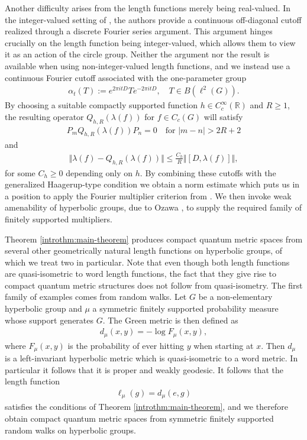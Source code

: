 \documentclass[12pt,a4paper,oneside,final,reqno]{amsart}
\newcommand{\R}{\mathbb{R}}
\theoremstyle{plain}
\theoremstyle{definition}
\begin{document}
Another difficulty arises from the length functions merely being real-valued. In the integer-valued setting of \cite{OzawaRieffel2005}, the authors provide a continuous off-diagonal cutoff realized through a discrete Fourier series argument. This argument hinges crucially on the length function being integer-valued, which allows them to view it as an action of the circle group. Neither the argument nor the result is available when using non-integer-valued length functions, and we instead use a continuous Fourier cutoff associated with the one-parameter group
\begin{align*}
    \alpha_t (T) := e^{2\pi i t D} T e^{-2\pi i t D},\quad T \in B(\ell^2(G)). 
\end{align*}
By choosing a suitable compactly supported function $h \in C_c^\infty(\R)$ and $R \geq 1$, the resulting operator $Q_{h,R}(\lambda(f))$ for $f \in C_c(G)$ will satisfy
\begin{align*}
    P_m Q_{h,R}(\lambda(f)) P_n = 0 \quad \text{for $|m-n| >  2R +2 $}
\end{align*}
and 
\begin{align*}
    \Vert \lambda(f) - Q_{h,R}(\lambda(f)) \Vert \leq \frac{C_h}{R} \Vert [D , \lambda(f)] \Vert,
\end{align*}
for some $C_h \geq 0$ depending only on $h$. By combining these cutoffs with the generalized Haagerup-type condition we obtain a norm estimate which puts us in a position to apply the Fourier multiplier criterion from \cite{AustadGpdCQMS}. We then invoke weak amenability of hyperbolic groups, due to Ozawa \cite{OzawaHyperbolicWeakAmenable2008}, to supply the required family of finitely supported multipliers. 

Theorem \ref{introthm:main-theorem} produces compact quantum metric spaces from several other geometrically natural length functions on hyperbolic groups, of which we treat two in particular. Note that even though both  length functions are quasi-isometric to word length functions, the fact that they give rise to compact quantum metric structures does not follow from quasi-isometry. 
The first family of examples comes from random walks. Let $G$ be a non-elementary hyperbolic group and $\mu$ a symmetric finitely supported probability measure whose support generates $G$. The Green metric is then defined as
\begin{align*}
    d_\mu (x,y) = - \log F_\mu (x,y),
\end{align*} 
where $F_\mu(x,y)$ is the probability of ever hitting $y$ when starting at $x$.
Then $d_\mu $ is a left-invariant hyperbolic metric which is quasi-isometric to a word metric. In particular it follows that it is proper and weakly geodesic. It follows that the length function
\begin{align*}
    \ell_\mu (g ) = d_\mu (e,g)
\end{align*}
satisfies the conditions of Theorem \ref{introthm:main-theorem}, and we therefore obtain compact quantum metric spaces from symmetric finitely supported random walks on hyperbolic groups. 
\end{document}
